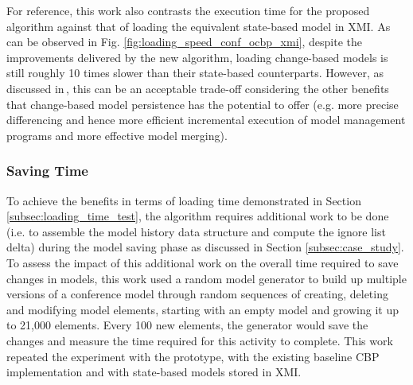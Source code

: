\documentclass[12pt, a4paper]{report} \usepackage[titletoc]{appendix}
\begin{document}
For reference, this work also contrasts the execution time for the proposed algorithm against that of loading the equivalent state-based model in XMI. As can be observed in Fig. \ref{fig:loading_speed_conf_ocbp_xmi}, despite the improvements delivered by the new algorithm, loading change-based models is still roughly 10 times slower than their state-based counterparts. However, as discussed in\,\cite{yohannis2017turning}, this can be an acceptable trade-off considering the other benefits that change-based model persistence has the potential to offer (e.g. more precise differencing and hence more efficient incremental execution of model management programs and more effective model merging).

\subsubsection{Saving Time}
\label{subsec:saving_time_test}

To achieve the benefits in terms of loading time demonstrated in Section \ref{subsec:loading_time_test}, the algorithm requires additional work to be done (i.e. to assemble the model history data structure and compute the ignore list delta) during the model saving phase as discussed in Section \ref{subsec:case_study}. To assess the impact of this additional work on the overall time required to save changes in models, this work used a random model generator to build up multiple versions of a conference model through random sequences of creating, deleting and modifying model elements, starting with an empty model and growing it up to 21,000 elements. Every 100 new elements, the generator would save the changes and measure the time required for this activity to complete. This work repeated the experiment with the prototype, with the existing baseline CBP implementation and with state-based models stored in XMI.
\end{document}
